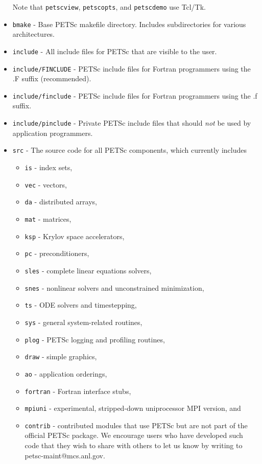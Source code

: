 \begin{itemize}
Note that {\tt petscview}, {\tt petscopts}, and {\tt petscdemo} use Tcl/Tk.
\item {\tt bmake} - Base PETSc makefile directory.  Includes subdirectories
                    for various architectures.
\item {\tt include} - All include files for PETSc that are visible to the user.
\item {\tt include/FINCLUDE} - PETSc include files for Fortran programmers using 
                               the .F suffix (recommended).
\item {\tt include/finclude} - PETSc include files for Fortran programmers using 
                               the .f suffix.
\item {\tt include/pinclude} - Private PETSc include files that should {\em not} be used by application programmers.
\item {\tt src} - The source code for all PETSc components, which
                  currently includes
 \begin{itemize}
 \item {\tt is} - index sets,
 \item {\tt vec} - vectors,
 \item {\tt da} - distributed arrays,
 \item {\tt mat} - matrices,
 \item {\tt ksp} - Krylov space accelerators,
 \item {\tt pc} - preconditioners,
 \item {\tt sles} - complete linear equations solvers,
 \item {\tt snes} - nonlinear solvers and unconstrained minimization,
 \item {\tt ts} - ODE solvers and timestepping,
 \item {\tt sys} - general system-related routines,
 \item {\tt plog} - PETSc logging and profiling routines,
 \item {\tt draw} - simple graphics,
 \item {\tt ao} - application orderings,
 \item {\tt fortran} - Fortran interface stubs,
 \item {\tt mpiuni} - experimental, stripped-down uniprocessor MPI version, and
 \item {\tt contrib} - contributed modules that use PETSc but are not
    part of the official PETSc package.  We encourage users who have
    developed such code that they wish to share with others to let us
    know by writing to petsc-maint@mcs.anl.gov.
 \end{itemize}
\end{itemize}

